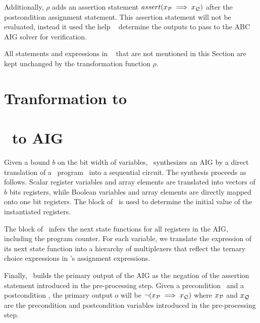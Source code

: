 Additionally, $\rho$ adds an assertion statement 
$assert(x_{\mathcal{P}} \implies x_{\mathcal{Q}})$ after the postcondition assignment statement. 
This assertion statement will not 
be evaluated, instead it used the help \mytool~ determine the outputs to pass
to the ABC AIG solver for verification. 


All statements and expressions in \Pm~ that are not mentioned in 
this Section are kept unchanged by the transformation function $\rho$. 

\section{Tranformation to \thislanguage} \label{chap:c2aig:sec:transformation_et}


\section{\thislanguage~to AIG}
\label{chap:c2aig:sec:etcirc_to_aig}
Given a bound $b$ on the bit width of variables,
\mytool~synthesizes an AIG by a direct translation of a \thislanguage~program \aigcircuit~into
a sequential circuit. The synthesis proceeds as follows.  
Scalar register variables and array elements are translated into vectors 
of $b$ bits registers, while Boolean variables and array elements are directly mapped
onto one bit registers. The  block of \aigcircuit~is used to determine the 
initial value of the instantiated registers. 

The  block of \aigcircuit~infers the next state functions for all 
registers in the AIG, including the program counter. For each variable, 
we translate the expression of its next state function into a hierarchy of 
multiplexers that reflect the ternary choice expressions in \aigcircuit's 
assignment expressions.

Finally, \mytool~builds the primary output of the AIG 
as the negation of the assertion statement introduced in the 
pre-processing step. Given a precondition \Pre~and 
a postcondition  \Post, the primary output $o$ will
be $\lnot (x_{\mathcal{P}} \implies x_{\mathcal{Q}})$ where $x_{\mathcal{P}}$ and
$x_{\mathcal{Q}}$ are the precondition and postcondition variables
introduced in the pre-processing step. 